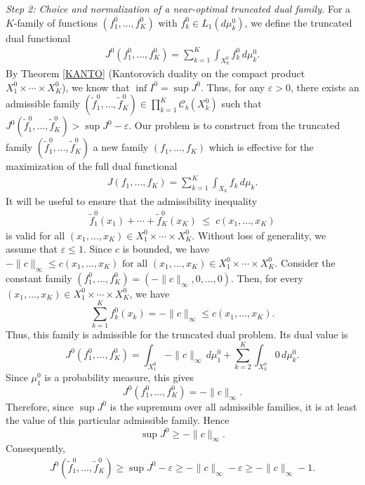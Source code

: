 \documentclass[twoside,11pt,a4paper]{article}
\newcommand*{\SavedRef}{}
\let\SavedRef\ref
\renewcommand*{\ref}[1]{  \begingroup
    \hypersetup{
      linkcolor=linkequation,
      linkbordercolor=linkequation,
    }    \SavedRef{#1}  \endgroup
}
\begin{document}
\medskip
\noindent\emph{Step 2: Choice and normalization of a near-optimal truncated dual family.}
For a $K$-family of functions $(f_1^0,\dots,f_K^0)$ with 
$f_k^0 \in L_1(d\mu_k^0)$, we define the truncated dual functional
\begin{align*}
J^0(f_1^0,\dots,f_K^0)
=
\sum_{k=1}^K \int_{X_k^0} f_k^0 \, d\mu_k^0.
\end{align*}
By Theorem \ref{KANTO} (Kantorovich duality on the compact product
$X_1^0 \times \cdots \times X_K^0$), we know that $\inf I^0
=
\sup J^0$. Thus, for any $\varepsilon>0$, there exists an admissible family 
$(\widetilde f_1^0,\ldots,\widetilde f_K^0) \in \prod_{k=1}^K \mathcal C_b(X_k^0)$ such that $J^0(\widetilde{f}_1^0,\dots,\widetilde{f}_K^0)
>
\sup J^0 - \varepsilon$. Our problem is to construct from the truncated family 
$(\widetilde{f}_1^0,\dots,\widetilde{f}_K^0)$ a new family 
$(f_1,\dots,f_K)$ which is effective for the maximization 
of the full dual functional
\begin{align*}
J(f_1,\dots,f_K)
=
\sum_{k=1}^K \int_{X_k} f_k \, d\mu_k.
\end{align*}
It will be useful to ensure that the admissibility inequality
\begin{align*}\label{admiss}
\widetilde{f}_1^0(x_1) + \cdots + \widetilde{f}_K^0(x_K)
\;\le\;
c(x_1,\dots,x_K)
\end{align*}
is valid for all 
\(
(x_1,\dots,x_K) \in X_1^0 \times \cdots \times X_K^0.
\)
Without loss of generality, we assume that $\varepsilon\le 1$. 
Since $c$ is bounded, we have $
-\|c\|_\infty \le c(x_1,\ldots,x_K) \text{ for all }(x_1,\ldots,x_K)\in X_1^0\times\cdots\times X_K^0$.
Consider the constant family $
(f_1^0,\ldots,f_K^0)
=
(-\|c\|_\infty,0,\ldots,0)$.
Then, for every $(x_1,\ldots,x_K)\in X_1^0\times\cdots\times X_K^0$, we have
\[
\sum_{k=1}^K f_k^0(x_k)
=
-\|c\|_\infty
\le
c(x_1,\ldots,x_K).
\]
Thus, this family is admissible for the truncated dual problem. Its dual value is
\[
J^0(f_1^0,\ldots,f_K^0)
=
\int_{X_1^0} -\|c\|_\infty\,d\mu_1^0
+
\sum_{k=2}^K \int_{X_k^0} 0\,d\mu_k^0.
\]
Since $\mu_1^0$ is a probability measure, this gives
\[
J^0(f_1^0,\ldots,f_K^0)
=
-\|c\|_\infty.
\]
Therefore, since $\sup J^0$ is the supremum over all admissible families, it is at least the value of this particular admissible family. Hence
\[
\sup J^0 \ge -\|c\|_\infty.
\]
Consequently,
\begin{align*}
J^0(\widetilde{f}_1^0,\dots,\widetilde{f}_K^0)
\ge \sup J^0 - \varepsilon 
\ge -\|c\|_\infty-\varepsilon 
\ge -\|c\|_\infty-1.
\end{align*}
\end{document}
